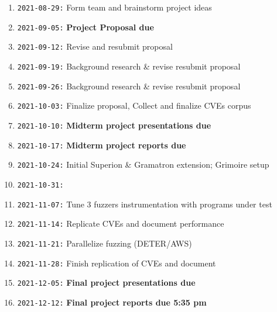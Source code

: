 \documentclass[12pt]{diazessay}
\begin{document}
\begin{enumerate}[label={}]
	\item \texttt{2021-08-29:} Form team and brainstorm project ideas
	\item \texttt{2021-09-05:} \textbf{Project Proposal due}
	\item \texttt{2021-09-12:} Revise and resubmit proposal
	\item \texttt{2021-09-19:} Background research \& revise \/ resubmit proposal
	\item \texttt{2021-09-26:} Background research \& revise \/ resubmit proposal
	\item \texttt{2021-10-03:} Finalize proposal, Collect and finalize CVEs corpus
	\item \texttt{2021-10-10:} \textbf{Midterm project presentations due}
	\item \texttt{2021-10-17:} \textbf{Midterm project reports due}
	\item \texttt{2021-10-24:} Initial Superion \& Gramatron extension; Grimoire setup
	\item \texttt{2021-10-31:} 
	\item \texttt{2021-11-07:} Tune 3 fuzzers instrumentation with programs under test
	\item \texttt{2021-11-14:} Replicate CVEs and document performance
	\item \texttt{2021-11-21:} Parallelize fuzzing \hfill (DETER/AWS)
	\item \texttt{2021-11-28:} Finish replication of CVEs and document
	\item \texttt{2021-12-05:} \textbf{Final project presentations due}
	\item \texttt{2021-12-12:} \textbf{Final project reports due 5:35 pm}
\end{enumerate}


\clearpage



\end{document}
